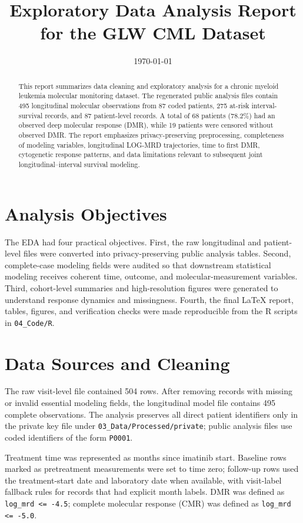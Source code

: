 \documentclass[11pt]{article}
\title{Exploratory Data Analysis Report for the GLW CML Dataset}
\author{}
\date{\today}
\begin{document}
\maketitle

\begin{abstract}
This report summarizes data cleaning and exploratory analysis for a chronic myeloid leukemia molecular monitoring dataset. The regenerated public analysis files contain 495 longitudinal molecular observations from 87 coded patients, 275 at-risk interval-survival records, and 87 patient-level records. A total of 68 patients (78.2\%) had an observed deep molecular response (DMR), while 19 patients were censored without observed DMR. The report emphasizes privacy-preserving preprocessing, completeness of modeling variables, longitudinal LOG-MRD trajectories, time to first DMR, cytogenetic response patterns, and data limitations relevant to subsequent joint longitudinal--interval survival modeling.
\end{abstract}

\section{Analysis Objectives}
The EDA had four practical objectives. First, the raw longitudinal and patient-level files were converted into privacy-preserving public analysis tables. Second, complete-case modeling fields were audited so that downstream statistical modeling receives coherent time, outcome, and molecular-measurement variables. Third, cohort-level summaries and high-resolution figures were generated to understand response dynamics and missingness. Fourth, the final LaTeX report, tables, figures, and verification checks were made reproducible from the R scripts in \texttt{04\_Code/R}.

\section{Data Sources and Cleaning}
The raw visit-level file contained 504 rows. After removing records with missing or invalid essential modeling fields, the longitudinal model file contains 495 complete observations. The analysis preserves all direct patient identifiers only in the private key file under \texttt{03\_Data/Processed/private}; public analysis files use coded identifiers of the form \texttt{P0001}.

Treatment time was represented as months since imatinib start. Baseline rows marked as pretreatment measurements were set to time zero; follow-up rows used the treatment-start date and laboratory date when available, with visit-label fallback rules for records that had explicit month labels. DMR was defined as \texttt{log\_mrd <= -4.5}; complete molecular response (CMR) was defined as \texttt{log\_mrd <= -5.0}.
\end{document}
